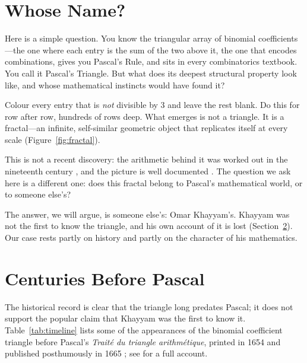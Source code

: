 \documentclass[11pt]{amsart}
\begin{document}
\tableofcontents

\section{Whose Name?}

Here is a simple question. You know the triangular array of binomial coefficients---the one where each entry is the sum of the two above it, the one that encodes combinations, gives you Pascal's Rule, and sits in every combinatorics textbook. You call it Pascal's Triangle. But what does its deepest structural property look like, and whose mathematical instincts would have found it?

Colour every entry that is \emph{not} divisible by 3 and leave the rest blank. Do this for row after row, hundreds of rows deep. What emerges is not a triangle. It is a fractal---an infinite, self-similar geometric object that replicates itself at every scale (Figure~\ref{fig:fractal}).

This is not a recent discovery: the arithmetic behind it was worked out in the nineteenth century \cite{kummer1852,lucas1878}, and the picture is well documented \cite{wolfram1984,reiter1993}. The question we ask here is a different one: does this fractal belong to Pascal's mathematical world, or to someone else's?

The answer, we will argue, is someone else's: Omar Khayyam's. Khayyam was not the first to know the triangle, and his own account of it is lost (Section~\ref{sec:history}). Our case rests partly on history and partly on the character of his mathematics.

\section{Centuries Before Pascal}\label{sec:history}

The historical record is clear that the triangle long predates Pascal; it does not support the popular claim that Khayyam was the first to know it. Table~\ref{tab:timeline} lists some of the appearances of the binomial coefficient triangle before Pascal's \emph{Traité du triangle arithmétique}, printed in 1654 and published posthumously in 1665 \cite{pascal1654}; see \cite{edwards1987} for a full account.
\end{document}
